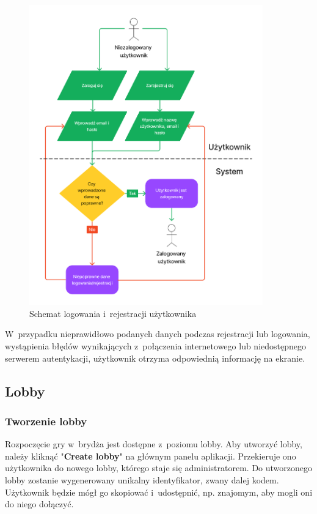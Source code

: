 \begin{figure}[hbt!]
    \centering
    \includegraphics[width=0.9\textwidth]{img/schematy/login.png}
    \caption{Schemat logowania i~rejestracji użytkownika}
\end{figure}

W~przypadku nieprawidłowo podanych danych podczas rejestracji
lub logowania, wystąpienia błędów wynikających z~połączenia internetowego lub
niedostępnego serwerem autentykacji, użytkownik otrzyma odpowiednią
informację na ekranie.

\FloatBarrier


\subsection{Lobby}

\subsubsection{Tworzenie lobby}

Rozpoczęcie gry w~brydża jest dostępne z~poziomu lobby. Aby utworzyć
lobby, należy kliknąć "\textbf{Create lobby}"\xspace na głównym panelu
aplikacji. Przekieruje ono użytkownika do nowego lobby, którego staje
się administratorem. Do utworzonego lobby zostanie wygenerowany
unikalny identyfikator, zwany dalej kodem. Użytkownik będzie mógł go skopiować
i~udostępnić, np. znajomym, aby mogli oni do niego dołączyć.


